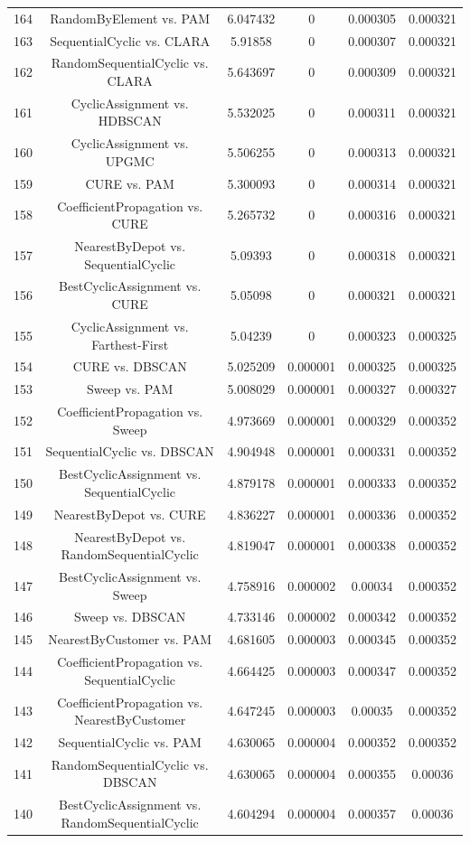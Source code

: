 \documentclass[a4paper,10pt]{article}
\begin{document}
\begin{landscape}
\begin{table}[!htp]
\begin{tabular}{cccccc}
164&RandomByElement vs. PAM&6.047432&0&0.000305&0.000321\\
163&SequentialCyclic vs. CLARA&5.91858&0&0.000307&0.000321\\
162&RandomSequentialCyclic vs. CLARA&5.643697&0&0.000309&0.000321\\
161&CyclicAssignment vs. HDBSCAN&5.532025&0&0.000311&0.000321\\
160&CyclicAssignment vs. UPGMC&5.506255&0&0.000313&0.000321\\
159&CURE vs. PAM&5.300093&0&0.000314&0.000321\\
158&CoefficientPropagation vs. CURE&5.265732&0&0.000316&0.000321\\
157&NearestByDepot vs. SequentialCyclic&5.09393&0&0.000318&0.000321\\
156&BestCyclicAssignment vs. CURE&5.05098&0&0.000321&0.000321\\
155&CyclicAssignment vs. Farthest-First&5.04239&0&0.000323&0.000325\\
154&CURE vs. DBSCAN&5.025209&0.000001&0.000325&0.000325\\
153&Sweep vs. PAM&5.008029&0.000001&0.000327&0.000327\\
152&CoefficientPropagation vs. Sweep&4.973669&0.000001&0.000329&0.000352\\
151&SequentialCyclic vs. DBSCAN&4.904948&0.000001&0.000331&0.000352\\
150&BestCyclicAssignment vs. SequentialCyclic&4.879178&0.000001&0.000333&0.000352\\
149&NearestByDepot vs. CURE&4.836227&0.000001&0.000336&0.000352\\
148&NearestByDepot vs. RandomSequentialCyclic&4.819047&0.000001&0.000338&0.000352\\
147&BestCyclicAssignment vs. Sweep&4.758916&0.000002&0.00034&0.000352\\
146&Sweep vs. DBSCAN&4.733146&0.000002&0.000342&0.000352\\
145&NearestByCustomer vs. PAM&4.681605&0.000003&0.000345&0.000352\\
144&CoefficientPropagation vs. SequentialCyclic&4.664425&0.000003&0.000347&0.000352\\
143&CoefficientPropagation vs. NearestByCustomer&4.647245&0.000003&0.00035&0.000352\\
142&SequentialCyclic vs. PAM&4.630065&0.000004&0.000352&0.000352\\
141&RandomSequentialCyclic vs. DBSCAN&4.630065&0.000004&0.000355&0.00036\\
140&BestCyclicAssignment vs. RandomSequentialCyclic&4.604294&0.000004&0.000357&0.00036\\

\end{tabular}
\end{table}
\end{landscape}
\end{document}
